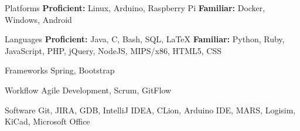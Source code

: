 
\vspace{0mm}
\begin{cvskills}

  \vspace{1mm}


  \cvskill
    {Platforms} %
    {\textbf{Proficient:} Linux, Arduino, Raspberry Pi \newline \textbf{Familiar:} Docker, Windows, Android} %

  \vspace{1mm}
  
  \cvskill
    {Languages} %
    {\textbf{Proficient:} Java, C, Bash, SQL, LaTeX \newline \textbf{Familiar:} Python, Ruby, JavaScript, PHP, jQuery, NodeJS, MIPS/x86, HTML5, CSS} %

  \vspace{1mm}

  \cvskill
    {Frameworks} %
    {Spring, Bootstrap} %

  \vspace{1mm}

  \cvskill
    {Workflow} %
    {Agile Development, Scrum, GitFlow} %

  \cvskill
    {Software} %
    {Git, JIRA, GDB, IntelliJ IDEA, CLion, Arduino IDE, MARS, Logisim, KiCad, Microsoft Office} %

\end{cvskills}

